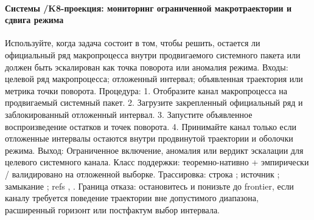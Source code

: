 \paragraph{Системы /\allowbreak K8-проекция: мониторинг ограниченной макротраектории и сдвига режима}
Используйте, когда задача состоит в том, чтобы решить, остается ли официальный ряд макропроцесса внутри продвигаемого системного пакета или должен быть эскалирован как точка поворота или аномалия режима.
Входы: целевой ряд макропроцесса; \allowbreak отложенный интервал; \allowbreak объявленная траектория или метрика точки поворота.
Процедура: 1. Отобразите канал макропроцесса на продвигаемый системный пакет. 2. Загрузите закрепленный официальный ряд и заблокированный отложенный интервал. 3. Запустите объявленное воспроизведение остатков и точек поворота. 4. Принимайте канал только если отложенные интервалы остаются внутри продвинутой траектории и оболочки режима.
Выход: Ограниченное включение, аномалия или вердикт эскалации для целевого системного канала.
Класс поддержки: теоремно-нативно + эмпирически / валидировано на отложенной выборке.
Трассировка: строка ; \allowbreak источник ; \allowbreak замыкание ; \allowbreak refs , \allowbreak {}.
Граница отказа: остановитесь и понизьте до frontier, если каналу требуется поведение траектории вне допустимого диапазона, расширенный горизонт или постфактум выбор интервала.

